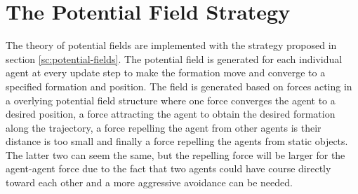 \section{The Potential Field Strategy}
The theory of potential fields are implemented with the strategy proposed in section \ref{sc:potential-fields}. The potential field is generated for each individual agent at every update step to make the formation move and converge to a specified formation and position. The field is generated based on forces acting in a overlying potential field structure where one force converges the agent to a desired position, a force attracting the agent to obtain the desired formation along the trajectory, a force repelling the agent from other agents is their distance is too small and finally a force repelling the agents from static objects. The latter two can seem the same, but the repelling force will be larger for the agent-agent force due to the fact that two agents could have course directly toward each other and a more aggressive avoidance can be needed.

